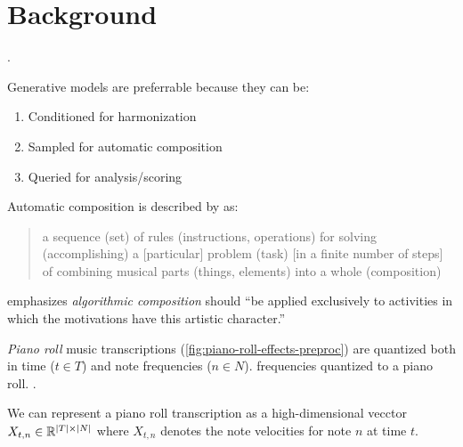 \chapter{Background}

\ifpdf
    \graphicspath{{Chapter2/Figs/Raster/}{Chapter2/Figs/PDF/}{Chapter2/Figs/}}
\else
    \graphicspath{{Chapter2/Figs/Vector/}{Chapter2/Figs/}}
\fi


.


Generative models are preferrable because they can be:
\begin{enumerate}
  \item Conditioned for harmonization
  \item Sampled for automatic composition
  \item Queried for analysis/scoring
\end{enumerate}
Automatic composition is described by \citet{papadopoulos1999ai} as:
\begin{quote}
  a sequence (set) of rules (instructions, operations) for solving (accomplishing) a [particular] problem (task)
  [in a finite number of steps] of combining musical parts (things, elements) into a whole (composition)
\end{quote}
\citet{pearce2002motivations} emphasizes \emph{algorithmic composition} should ``be applied exclusively
to activities in which the motivations have this artistic character.''



\emph{Piano roll} music transcriptions
(\cref{fig:piano-roll-effects-preproc}) are quantized both in time ($t \in
T$) and note frequencies ($n \in N$). frequencies quantized to a piano roll.
.

We can represent a piano roll transcription as a high-dimensional vecctor
$X_{t,n} \in \mathbb{R}^{|T| \times |N|}$ where $X_{t,n}$ denotes the note
velocities for note $n$ at time $t$.

